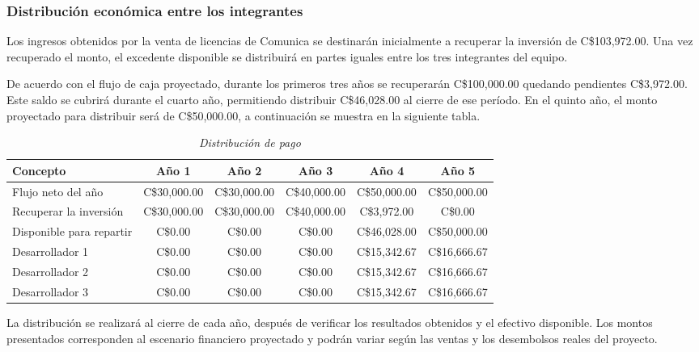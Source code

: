 \subsubsection{Distribución económica entre los integrantes}
Los ingresos obtenidos por la venta de licencias de Comunica se destinarán inicialmente a recuperar la inversión de C\$103,972.00. Una vez recuperado el monto, el excedente disponible se distribuirá en partes iguales entre los tres integrantes del equipo.

De acuerdo con el flujo de caja proyectado, durante los primeros tres años se recuperarán C\$100,000.00 quedando pendientes C\$3,972.00. Este saldo se cubrirá durante el cuarto año, permitiendo distribuir C\$46,028.00 al cierre de ese período. En el quinto año, el monto proyectado para distribuir será de C\$50,000.00, a continuación se muestra en la siguiente tabla.

\begin{table}[htbp]
	\centering
	\caption{\emph{Distribución de pago}}
	\label{tab:distribucion_pago}
	\small
	\begin{tabularx}{\textwidth}{X c c c c c}
		\toprule
		\textbf{Concepto} & \textbf{Año 1} & \textbf{Año 2} & \textbf{Año 3} & \textbf{Año 4} & \textbf{Año 5} \\
		\midrule
		Flujo neto del año & C\$30,000.00 & C\$30,000.00 & C\$40,000.00 & C\$50,000.00 & C\$50,000.00 \\
		Recuperar la inversión & C\$30,000.00 & C\$30,000.00 & C\$40,000.00 & C\$3,972.00 & C\$0.00 \\
		Disponible para repartir & C\$0.00 & C\$0.00 & C\$0.00 & C\$46,028.00 & C\$50,000.00 \\
		\midrule
		Desarrollador 1 & C\$0.00 & C\$0.00 & C\$0.00 & C\$15,342.67 & C\$16,666.67 \\
		Desarrollador 2 & C\$0.00 & C\$0.00 & C\$0.00 & C\$15,342.67 & C\$16,666.67 \\
		Desarrollador 3 & C\$0.00 & C\$0.00 & C\$0.00 & C\$15,342.67 & C\$16,666.67 \\
		\bottomrule
	\end{tabularx}
\end{table}

La distribución se realizará al cierre de cada año, después de verificar los resultados obtenidos y el efectivo disponible. Los montos presentados corresponden al escenario financiero proyectado y podrán variar según las ventas y los desembolsos reales del proyecto.

